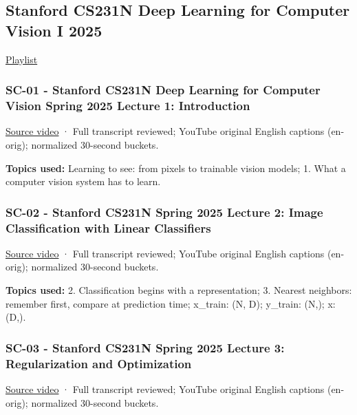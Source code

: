 \subsection{Stanford CS231N Deep Learning for Computer Vision I 2025}\label{04-visual-computing-ii-ch036-stanford-cs231n-deep-learning-for-computer-vision-i-2025}

\href{https://www.youtube.com/playlist?list=PLoROMvodv4rOmsNzYBMe0gJY2XS8AQg16}{Playlist}

\subsubsection{SC-01 - Stanford CS231N Deep Learning for Computer Vision Spring 2025 Lecture 1: Introduction}\label{04-visual-computing-ii-ch036-sc-01---stanford-cs231n-deep-learning-for-computer-vision-spring-2025-lecture-1-introduction}

\href{https://www.youtube.com/watch?v=2fq9wYslV0A}{Source video} · Full transcript reviewed; YouTube original English captions (en-orig); normalized 30-second buckets.

\textbf{Topics used:} Learning to see: from pixels to trainable vision models; 1. What a computer vision system has to learn.

\subsubsection{SC-02 - Stanford CS231N Spring 2025 Lecture 2: Image Classification with Linear Classifiers}\label{04-visual-computing-ii-ch036-sc-02---stanford-cs231n-spring-2025-lecture-2-image-classification-with-linear-classifiers}

\href{https://www.youtube.com/watch?v=pdqofxJeBN8}{Source video} · Full transcript reviewed; YouTube original English captions (en-orig); normalized 30-second buckets.

\textbf{Topics used:} 2. Classification begins with a representation; 3. Nearest neighbors: remember first, compare at prediction time; x\_train: (N, D); y\_train: (N,); x: (D,).

\subsubsection{SC-03 - Stanford CS231N Spring 2025 Lecture 3: Regularization and Optimization}\label{04-visual-computing-ii-ch036-sc-03---stanford-cs231n-spring-2025-lecture-3-regularization-and-optimization}

\href{https://www.youtube.com/watch?v=dyNGd06MWn4}{Source video} · Full transcript reviewed; YouTube original English captions (en-orig); normalized 30-second buckets.

